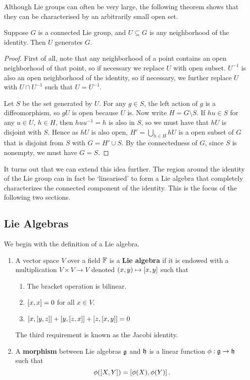 \documentclass[a4paper]{article}
\begin{document}
Although Lie groups can often be very large, the following theorem shows that they can be characterised by an arbitrarily small open set.

\begin{thm}
    Suppose $G$ is a connected Lie group, and $U \subseteq G$ is any neighborhood of the identity. Then $U$ generates $G$.
\end{thm}

\begin{proof}
First of all, note that any neighborhood of a point contains an open neighborhood of that point, so if necessary we replace $U$ with open subset. $U^{-1}$ is also an open neighborhood of the identity, so if necessary, we further replace $U$ with $U \cap U^{-1}$ such that $U=U^{-1}$.

Let $S$ be the set generated by $U$. For any $g \in S$, the left action of $g$ is a diffeomorphism, so $gU$ is open because $U$ is. Now write $H = G \setminus S$. If $hu \in S$ for any $u \in U$, $h \in H$, then $huu^{-1} = h$ is also in $S$, so we must have that $hU$ is disjoint with $S$. Hence as $hU$ is also open, $H' = \bigcup_{h \in H} hU$ is a open subset of $G$ that is disjoint from $S$ with $G = H' \cup S$. By the connectedness of $G$, since $S$ is nonempty, we must have $G=S$. 
\end{proof}

It turns out that we can extend this idea further. The region around the identity of the Lie group can in fact be `linearised' to form a Lie algebra that completely characterizes the connected component of the identity. This is the focus of the following two sections.

\subsection{Lie Algebras}
We begin with the definition of a Lie algebra.

\begin{defi}\end{defi}

\begin{enumerate}
    \item A vector space $V$ over a field $\mathbb{F}$ is a \textbf{Lie algebra} if it is endowed with a multiplication $V \times V \to V$ denoted $(x, y) \mapsto \left[ x, y \right]$ such that
    \begin{enumerate}
        \item The bracket operation is bilinear.
        \item $\left[ x, x \right] = 0$ for all $x \in V$. 
        \item $\left[ x, \left[ y, z \right] \right] + \left[ y, \left[ z, x \right] \right] + \left[ z, \left[ x, y \right] \right] = 0$
    \end{enumerate}
    The third requirement is known as the Jacobi identity.
    \item A \textbf{morphism} between Lie algebras $\mathfrak{g}$ and $\mathfrak{h}$ is a linear function $\phi : \mathfrak{g} \to \mathfrak{h}$ such that 
    $$\phi(\left[ X, Y \right]) = \left[ \phi(X), \phi(Y) \right].$$
\end{enumerate}
\end{document}
